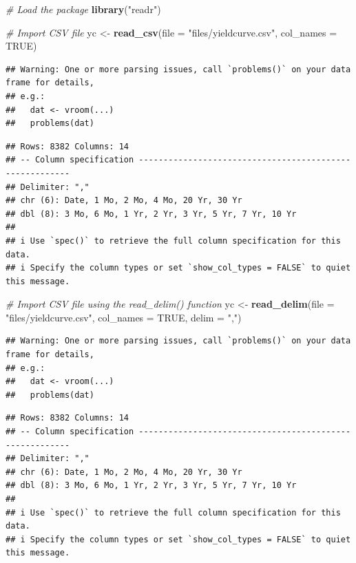 \documentclass[
]{book}
\newenvironment{Shaded}{\begin{snugshade}}{\end{snugshade}}
\newcommand{\AttributeTok}[1]{\textcolor[rgb]{0.13,0.29,0.53}{#1}}
\newcommand{\CommentTok}[1]{\textcolor[rgb]{0.56,0.35,0.01}{\textit{#1}}}
\newcommand{\ConstantTok}[1]{\textcolor[rgb]{0.56,0.35,0.01}{#1}}
\newcommand{\FunctionTok}[1]{\textcolor[rgb]{0.13,0.29,0.53}{\textbf{#1}}}
\newcommand{\NormalTok}[1]{#1}
\newcommand{\OtherTok}[1]{\textcolor[rgb]{0.56,0.35,0.01}{#1}}
\newcommand{\StringTok}[1]{\textcolor[rgb]{0.31,0.60,0.02}{#1}}
\begin{document}
\begin{Shaded}
\begin{Highlighting}[]
\CommentTok{\# Load the package}
\FunctionTok{library}\NormalTok{(}\StringTok{"readr"}\NormalTok{)}

\CommentTok{\# Import CSV file}
\NormalTok{yc }\OtherTok{\textless{}{-}} \FunctionTok{read\_csv}\NormalTok{(}\AttributeTok{file =} \StringTok{"files/yieldcurve.csv"}\NormalTok{, }\AttributeTok{col\_names =} \ConstantTok{TRUE}\NormalTok{)}
\end{Highlighting}
\end{Shaded}

\begin{verbatim}
## Warning: One or more parsing issues, call `problems()` on your data frame for details,
## e.g.:
##   dat <- vroom(...)
##   problems(dat)
\end{verbatim}

\begin{verbatim}
## Rows: 8382 Columns: 14
## -- Column specification --------------------------------------------------------
## Delimiter: ","
## chr (6): Date, 1 Mo, 2 Mo, 4 Mo, 20 Yr, 30 Yr
## dbl (8): 3 Mo, 6 Mo, 1 Yr, 2 Yr, 3 Yr, 5 Yr, 7 Yr, 10 Yr
## 
## i Use `spec()` to retrieve the full column specification for this data.
## i Specify the column types or set `show_col_types = FALSE` to quiet this message.
\end{verbatim}

\begin{Shaded}
\begin{Highlighting}[]
\CommentTok{\# Import CSV file using the read\_delim() function}
\NormalTok{yc }\OtherTok{\textless{}{-}} \FunctionTok{read\_delim}\NormalTok{(}\AttributeTok{file =} \StringTok{"files/yieldcurve.csv"}\NormalTok{, }\AttributeTok{col\_names =} \ConstantTok{TRUE}\NormalTok{, }\AttributeTok{delim =} \StringTok{","}\NormalTok{)}
\end{Highlighting}
\end{Shaded}

\begin{verbatim}
## Warning: One or more parsing issues, call `problems()` on your data frame for details,
## e.g.:
##   dat <- vroom(...)
##   problems(dat)
\end{verbatim}

\begin{verbatim}
## Rows: 8382 Columns: 14
## -- Column specification --------------------------------------------------------
## Delimiter: ","
## chr (6): Date, 1 Mo, 2 Mo, 4 Mo, 20 Yr, 30 Yr
## dbl (8): 3 Mo, 6 Mo, 1 Yr, 2 Yr, 3 Yr, 5 Yr, 7 Yr, 10 Yr
## 
## i Use `spec()` to retrieve the full column specification for this data.
## i Specify the column types or set `show_col_types = FALSE` to quiet this message.
\end{verbatim}
\end{document}
